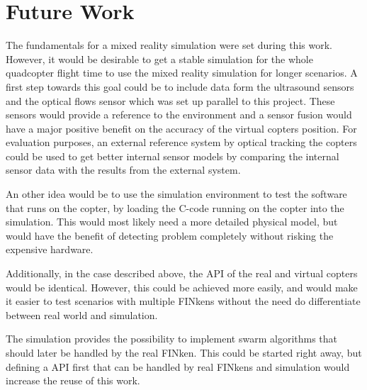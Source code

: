 \section{Future Work}
\label{sec:future}
The fundamentals for a mixed reality simulation were set during this work.
However, it would be desirable to get a stable simulation for the whole quadcopter flight time to use the mixed reality simulation for longer scenarios.
A first step towards this goal could be to include data form the ultrasound sensors and the optical flows sensor which was set up parallel to this project.
These sensors would provide a reference to the environment and a sensor fusion would have a major positive benefit on the accuracy of the virtual copters position.
For evaluation purposes, an external reference system by optical tracking the copters could be used to get better internal sensor models by comparing the internal sensor data with the results from the external system.

An other idea would be to use the simulation environment to test the software that runs on the copter, by loading the C-code running on the copter into the simulation.
This would most likely need a more detailed physical model, but would have the benefit of detecting problem completely without risking the expensive hardware.

Additionally, in the case described above, the API of the real and virtual copters would be identical. 
However, this could be achieved more easily, and would make it easier to test scenarios with multiple FINkens without the need do differentiate between real world and simulation.


The simulation  provides the possibility to implement swarm algorithms that should later be handled by the real FINken.
This could be started right away, but defining a API first that can be handled by real FINkens and simulation would increase the reuse of this work.







